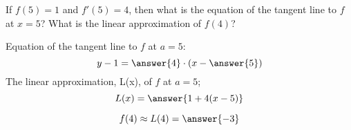 \documentclass{ximera}
\author{Steven Gubkin\and Nela Lakos}
\begin{document}
\begin{exercise}
If $f(5)=1$ and $f'(5) = 4$, then what is the equation of the tangent
line to $f$ at $x=5$?  What is the linear approximation of $f(4)$?

\begin{prompt}
Equation of the tangent line to $f$ at $a=5$:
 $$y-1 = \answer{4}\cdot(x-\answer{5})$$
The linear approximation, L(x), of $f$ at $a=5$;
  $$L(x) = \answer{1+4(x-5)}$$
  
  $$f(4) \approx L(4)= \answer{-3}$$
\end{prompt}



\end{exercise}
\end{document}
